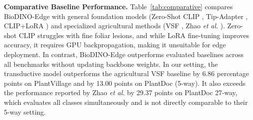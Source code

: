 \documentclass[conference]{IEEEtran}
\begin{document}
{\renewcommand{\arraystretch}{0.96}
\begin{table}[htbp]
\caption{Cross-Domain 5-Shot Benchmark on PlantVillage (11-Class) \& PlantDoc}
\label{tab:comparative}
\centering
{}
\end{table}
}

\textbf{Comparative Baseline Performance.} Table~\ref{tab:comparative} compares BioDINO-Edge with general foundation models (Zero-Shot CLIP \cite{radford2021clip}, Tip-Adapter \cite{zhang2022tip}, CLIP+LoRA \cite{hu2022lora}) and specialized agricultural methods (VSF \cite{zhou2026vsf}, Zhao \textit{et al.} \cite{zhao2026lightweight}). Zero-shot CLIP struggles with fine foliar lesions, and while LoRA fine-tuning improves accuracy, it requires GPU backpropagation, making it unsuitable for edge deployment. In contrast, BioDINO-Edge outperforms evaluated baselines across all benchmarks without updating backbone weights. In our setting, the transductive model outperforms the agricultural VSF baseline \cite{zhou2026vsf} by 6.86 percentage points on PlantVillage and by 13.00 points on PlantDoc (5-way). It also exceeds the performance reported by Zhao \textit{et al.} \cite{zhao2026lightweight} by 29.37 points on PlantDoc 27-way, which evaluates all classes simultaneously and is not directly comparable to their 5-way setting.
\end{document}
